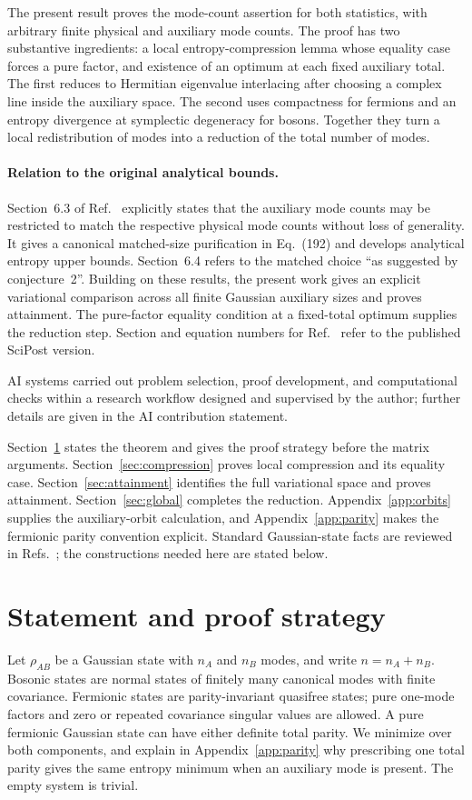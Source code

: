 \documentclass[11pt,a4paper]{article}
\numberwithin{equation}{section}
\theoremstyle{remark}
\begin{document}
The present result proves the mode-count assertion for both statistics, with arbitrary finite physical and auxiliary mode counts. The proof has two substantive ingredients: a local entropy-compression lemma whose equality case forces a pure factor, and existence of an optimum at each fixed auxiliary total. The first reduces to Hermitian eigenvalue interlacing after choosing a complex line inside the auxiliary space. The second uses compactness for fermions and an entropy divergence at symplectic degeneracy for bosons. Together they turn a local redistribution of modes into a reduction of the total number of modes.

\paragraph{Relation to the original analytical bounds.}
Section~6.3 of Ref.~\cite{Windt2021} explicitly states that the auxiliary mode counts may be restricted to match the respective physical mode counts without loss of generality. It gives a canonical matched-size purification in Eq.~(192) and develops analytical entropy upper bounds. Section~6.4 refers to the matched choice ``as suggested by conjecture~2''. Building on these results, the present work gives an explicit variational comparison across all finite Gaussian auxiliary sizes and proves attainment. The pure-factor equality condition at a fixed-total optimum supplies the reduction step. Section and equation numbers for Ref.~\cite{Windt2021} refer to the published SciPost version.

AI systems carried out problem selection, proof development, and computational checks within a research workflow designed and supervised by the author; further details are given in the AI contribution statement.

Section~\ref{sec:setup} states the theorem and gives the proof strategy before the matrix arguments. Section~\ref{sec:compression} proves local compression and its equality case. Section~\ref{sec:attainment} identifies the full variational space and proves attainment. Section~\ref{sec:global} completes the reduction. Appendix~\ref{app:orbits} supplies the auxiliary-orbit calculation, and Appendix~\ref{app:parity} makes the fermionic parity convention explicit. Standard Gaussian-state facts are reviewed in Refs.~\cite{Windt2021,Hackl2021}; the constructions needed here are stated below.

\section{Statement and proof strategy}\label{sec:setup}
Let $\rho_{AB}$ be a Gaussian state with $n_A$ and $n_B$ modes, and write $n=n_A+n_B$. Bosonic states are normal states of finitely many canonical modes with finite covariance. Fermionic states are parity-invariant quasifree states; pure one-mode factors and zero or repeated covariance singular values are allowed. A pure fermionic Gaussian state can have either definite total parity. We minimize over both components, and explain in Appendix~\ref{app:parity} why prescribing one total parity gives the same entropy minimum when an auxiliary mode is present. The empty system is trivial.
\end{document}
